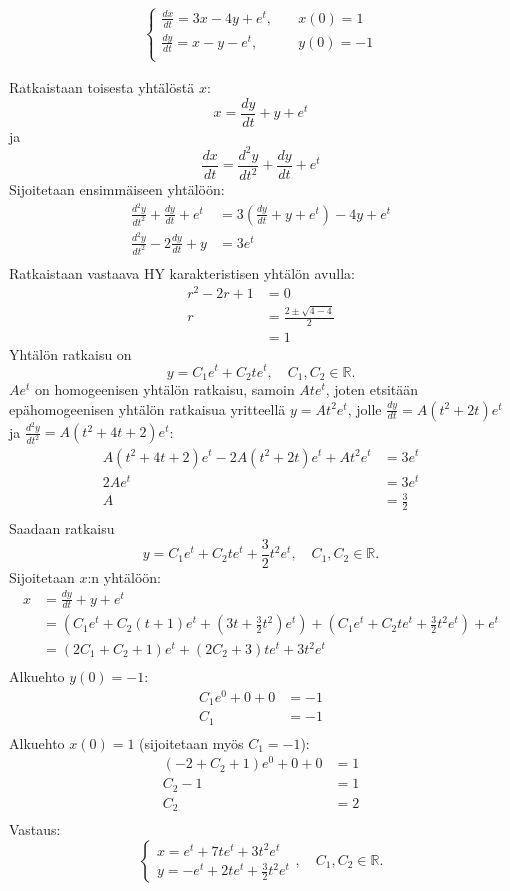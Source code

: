 \documentclass{article}
\begin{document}
\begin{align*}
  \begin{cases}
    \frac{dx}{dt} = 3x - 4y + e^t, \quad & x(0) = 1 \\
    \frac{dy}{dt} = x - y - e^t, & y(0) = -1 \\
  \end{cases}
\end{align*}

Ratkaistaan toisesta yhtälöstä $x$:
\[
  x = \frac{dy}{dt} + y + e^t
\]
ja
\[
  \frac{dx}{dt} = \frac{d^2 y}{d t^2} + \frac{dy}{dt} + e^t
\]
Sijoitetaan ensimmäiseen yhtälöön:
\begin{align*}
  \frac{d^2 y}{d t^2} + \frac{dy}{dt} + e^t &= 3(\frac{dy}{dt} + y + e^t) - 4y + e^t \\
  \frac{d^2 y}{d t^2} - 2\frac{dy}{dt} + y &= 3e^t \\
\end{align*}
Ratkaistaan vastaava HY karakteristisen yhtälön avulla:
\begin{align*}
  r^2 - 2r + 1 &= 0 \\
  r &= \frac{2 \pm \sqrt{4 - 4}}{2} \\
    &= 1
\end{align*}
Yhtälön ratkaisu on
\[
  y = C_1e^t + C_2te^t, \quad C_1,C_2 \in \mathbb{R}.
\]
$Ae^t$ on homogeenisen yhtälön ratkaisu, samoin $Ate^t$, joten etsitään
epähomogeenisen yhtälön ratkaisua yritteellä $y = At^2e^t$,
jolle $\frac{dy}{dt} = A(t^2 + 2t)e^t$ ja
$\frac{d^2 y}{d t^2} = A(t^2 + 4t + 2)e^t$:
\begin{align*}
  A(t^2 + 4t + 2)e^t - 2A(t^2 + 2t)e^t + At^2e^t &= 3e^t \\
  2Ae^t &= 3e^t \\
  A &= \frac{3}{2} \\
\end{align*}
Saadaan ratkaisu
\[
  y = C_1e^t + C_2te^t + \frac{3}{2}t^2e^t, \quad C_1,C_2 \in \mathbb{R}.
\]
Sijoitetaan $x$:n yhtälöön:
\begin{align*}
  x &= \frac{dy}{dt} + y + e^t \\
    &= (C_1e^t + C_2(t + 1)e^t + (3t + \frac{3}{2}t^2)e^t)
      + (C_1e^t + C_2te^t + \frac{3}{2}t^2e^t) + e^t \\
    &= (2C_1 + C_2 + 1)e^t + (2C_2 + 3)te^t + 3t^2e^t \\
\end{align*}
Alkuehto $y(0) = -1$:
\begin{align*}
  C_1e^0 + 0 + 0 &= -1 \\
  C_1 &= -1 \\
\end{align*}
Alkuehto $x(0) = 1$ (sijoitetaan myös $C_1 = -1$):
\begin{align*}
  (-2 + C_2 + 1)e^0 + 0 + 0 &= 1 \\
  C_2 - 1 &= 1 \\
  C_2 &= 2 \\
\end{align*}
Vastaus:
\[
  \begin{cases}
    x = e^t + 7te^t + 3t^2e^t \\
    y = -e^t + 2te^t + \frac{3}{2}t^2e^t
  \end{cases}, \quad C_1,C_2 \in \mathbb{R}.
\]
\end{document}
